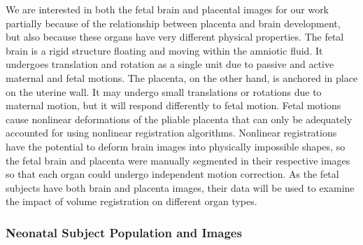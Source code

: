 
We are interested in both the fetal brain and placental images for our work partially because of the relationship between placenta and brain development, but also because these organs have very different physical properties. The fetal brain is a rigid structure floating and moving within the amniotic fluid. It undergoes translation and rotation as a single unit due to passive and active maternal and fetal motions. The placenta, on the other hand, is anchored in place on the uterine wall. It may undergo small translations or rotations due to maternal motion, but it will respond differently to fetal motion. Fetal motions cause nonlinear deformations of the pliable placenta that can only be adequately accounted for using nonlinear registration algorithms. Nonlinear registrations have the potential to deform brain images into physically impossible shapes, so the fetal brain and placenta were manually segmented in their respective images so that each organ could undergo independent motion correction. As the fetal subjects have both brain and placenta images, their data will be used to examine the impact of volume registration on different organ types.


\subsubsection{Neonatal Subject Population and Images}


